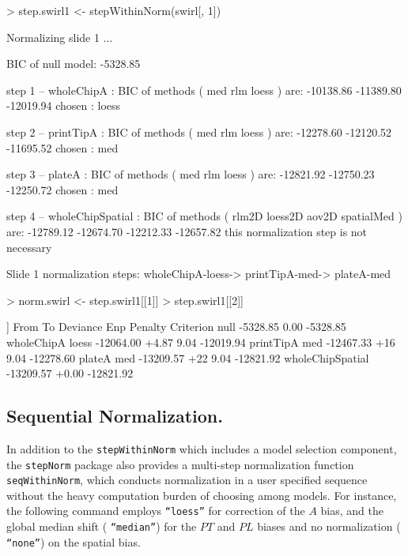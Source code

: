 \documentclass[11pt]{article}
\newcommand{\code}[1]{{\tt #1}}
\newcommand{\Rfunc}[1]{{\tt #1}}
\begin{document}
\begin{Schunk}
\begin{Sinput}
> step.swirl1 <- stepWithinNorm(swirl[, 1])
\end{Sinput}
\begin{Soutput}
Normalizing slide  1 ...

BIC of null model:  -5328.85 

step  1 -- wholeChipA :
BIC of methods ( med rlm loess ) are:  -10138.86 -11389.80 -12019.94 
chosen :  loess 

step  2 -- printTipA :
BIC of methods ( med rlm loess ) are:  -12278.60 -12120.52 -11695.52 
chosen :  med 

step  3 -- plateA :
BIC of methods ( med rlm loess ) are:  -12821.92 -12750.23 -12250.72 
chosen :  med 

step  4 -- wholeChipSpatial :
BIC of methods ( rlm2D loess2D aov2D spatialMed ) are:  -12789.12 -12674.70 -12212.33 -12657.82 
this normalization step is not necessary

Slide 1 normalization steps:  wholeChipA-loess-> printTipA-med-> plateA-med 
\end{Soutput}
\begin{Sinput}
> norm.swirl <- step.swirl1[[1]]
> step.swirl1[[2]]
\end{Sinput}
\begin{Soutput}
[[1]]
                 From    To  Deviance   Enp Penalty Criterion
null                         -5328.85  0.00          -5328.85
wholeChipA            loess -12064.00 +4.87    9.04 -12019.94
printTipA               med -12467.33   +16    9.04 -12278.60
plateA                  med -13209.57   +22    9.04 -12821.92
wholeChipSpatial            -13209.57 +0.00         -12821.92
\end{Soutput}
\end{Schunk}



\subsection{Sequential Normalization.}  

In addition to the \Rfunc{stepWithinNorm}
which includes a model selection component, the \code{stepNorm} package
also provides a multi-step normalization function \Rfunc{seqWithinNorm}, which
conducts normalization in a user specified sequence without the heavy computation 
burden of choosing among models. For instance, the following command employs
\code{``loess''} for correction of the $A$ bias, and the global median shift (
\code{``median''}) for the $PT$ and $PL$ biases and no normalization (
\code{``none''}) on the spatial bias.
 
\end{document}
